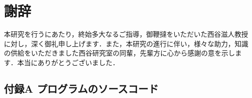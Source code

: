 \chapter{謝辞}\label{ux8b1dux8f9e}

本研究を行うにあたり，終始多大なるご指導，御鞭撻をいただいた西谷滋人教授に対し，深く御礼申し上げます．また，本研究の進行に伴い，様々な助力，知識の供給をいただきました西谷研究室の同輩，先輩方に心から感謝の意を示します．本当にありがとうございました．

    \section{付録A
プログラムのソースコード}\label{ux4ed8ux9332a-ux30d7ux30edux30b0ux30e9ux30e0ux306eux30bdux30fcux30b9ux30b3ux30fcux30c9}


